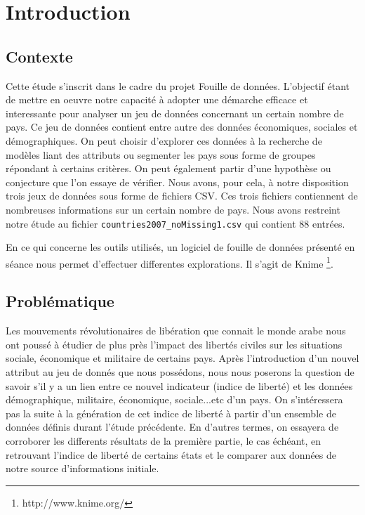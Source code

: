 \section{Introduction}

\subsection{Contexte}
Cette étude s'inscrit dans le cadre du projet Fouille de données. L'objectif étant de mettre en oeuvre notre capacité à adopter une démarche efficace et interessante pour analyser un jeu de données concernant un certain nombre de pays.
Ce jeu de données contient entre autre des données économiques, sociales et démographiques. On peut choisir d'explorer ces données à la recherche de modèles liant des attributs ou segmenter les pays sous forme de groupes répondant à certains critères. On peut également partir d'une hypothèse ou conjecture que l'on essaye de vérifier.  
Nous avons, pour cela, à notre disposition trois jeux de données sous forme de fichiers CSV. Ces trois fichiers contiennent de nombreuses informations sur un certain nombre de pays. Nous avons restreint notre étude au fichier \verb!countries2007_noMissing1.csv! qui contient 88 entrées.

En ce qui concerne les outils utilisés, un logiciel de fouille de données présenté en séance nous permet d'effectuer differentes explorations. Il s'agit de Knime \footnote{http://www.knime.org/}. 

\subsection{Problématique}

Les mouvements révolutionaires de libération que connait le monde arabe nous ont poussé à étudier de plus près l'impact des libertés civiles sur les situations sociale, économique et militaire de certains pays.
Après l'introduction d'un nouvel attribut au jeu de donnés que nous possédons, nous nous poserons la question de savoir s'il y a un lien entre ce nouvel indicateur (indice de liberté) et les données démographique, militaire, économique, sociale...etc d'un pays.
On s'intéressera pas la suite à la génération de cet indice de liberté à partir d'un ensemble de données définis durant l'étude précédente. En d'autres termes, on essayera de corroborer les differents résultats de la première partie, le cas échéant, en retrouvant l'indice de liberté de certains états et le comparer aux données de notre source d'informations initiale.




